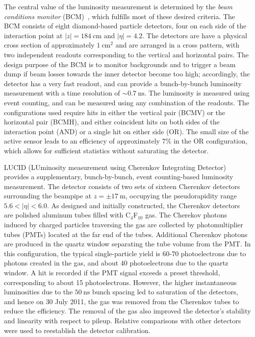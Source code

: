 The central value of the luminosity measurement is determined by the \emph{beam conditions monitor} (BCM)~\cite{Cindro:2008zz}, which fulfills most of these desired criteria. The BCM consists of eight diamond-based particle detectors, four on each side of the interaction point at $|z|=\SI{184}{\centi\meter}$ and $|\eta|=4.2$. The detectors are have a physical cross section of approximately $\SI{1}{\centi\meter\tothe{2}}$ and are arranged in a cross pattern, with two independent readouts corresponding to the vertical and horizontal pairs. The design purpose of the BCM is to monitor backgrounds and to trigger a beam dump if beam losses towards the inner detector become too high; accordingly, the detector has a very fast readout, and can provide a bunch-by-bunch luminosity measurement with a time resolution of $\sim \SI{0.7}{\nano\second}$. The luminosity is measured using event counting, and can be measured using any combination of the readouts. The configurations used require hits in either the vertical pair (BCMV) or the horizontal pair (BCMH), and either coincident hits on both sides of the interaction point (AND) or a single hit on either side (OR). The small size of the active sensor leads to an efficiency of approximately 7\% in the OR configuration, which allows for sufficient statistics without saturating the detector. 

LUCID (LUminosity measurement using Cherenkov Integrating Detector)~\cite{TheATLASCollaboration:2008fg} provides a supplementary, bunch-by-bunch, event counting-based luminosity measurement. The detector consists of two sets of sixteen Cherenkov detectors surrounding the beampipe at $z=\pm\SI{17}{\meter}$, occupying the pseudorapidity range $5.6<|\eta|<6.0$. As designed and initially constructed, the Cherenkov detectors are polished aluminum tubes filled with C$_4$F$_{10}$ gas. The Cherekov photons induced by charged particles traversing the gas are collected by photomultiplier tubes (PMTs) located at the far end of the tubes. Additional Cherenkov photons are produced in the quartz window separating the tube volume from the PMT. In this configuration, the typical single-particle yield is 60-70 photoelectrons due to photons created in the gas, and about 40 photoelectrons due to the quartz window. A hit is recorded if the PMT signal exceeds a preset threshold, corresponding to about 15 photoelectrons. However, the higher instantaneous luminosities due to the $\SI{50}{\nano\second}$ bunch spacing led to saturation of the detectors, and hence on 30 July 2011, the gas was removed from the Cherenkov tubes to reduce the efficiency. The removal of the gas also improved the detector's stability and linearity with respect to pileup. Relative comparisons with other detectors were used to reestablish the detector calibration.

